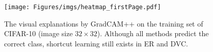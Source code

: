 \begin{figure}
    \centering
    \texttt{[image: Figures/imgs/heatmap\_firstPage.pdf]}
    \caption{The visual explanations by GradCAM++ on the training set of CIFAR-10 (image size $32 \times 32$).
    Although all methods predict the correct class, shortcut learning still exists in ER and DVC.}
    \label{fig:heatmap}
\end{figure}